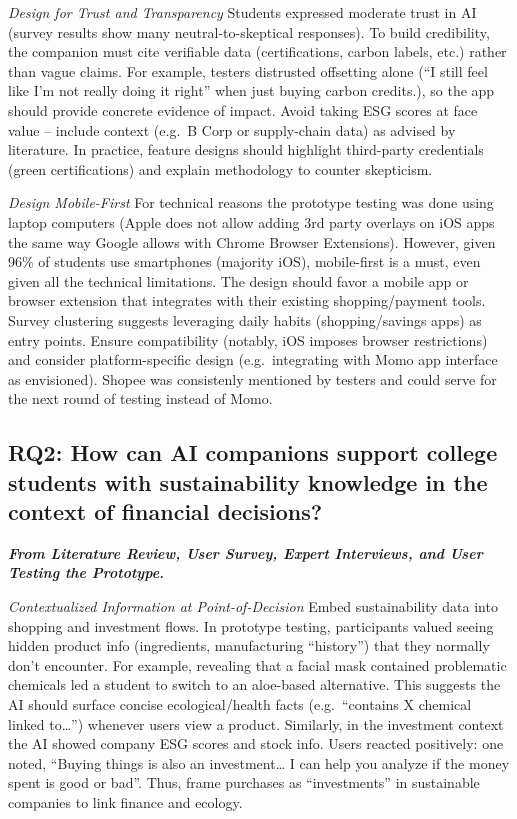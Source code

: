 \documentclass[
  12pt,
  letterpaper,
  DIV=11,
  numbers=noendperiod]{scrartcl}
\begin{document}
\emph{Design for Trust and Transparency} Students expressed moderate
trust in AI (survey results show many neutral-to-skeptical responses).
To build credibility, the companion must cite verifiable data
(certifications, carbon labels, etc.) rather than vague claims. For
example, testers distrusted offsetting alone (``I still feel like I'm
not really doing it right'' when just buying carbon credits.), so the
app should provide concrete evidence of impact. Avoid taking ESG scores
at face value -- include context (e.g.~B Corp or supply-chain data) as
advised by literature. In practice, feature designs should highlight
third-party credentials (green certifications) and explain methodology
to counter skepticism.

\emph{Design Mobile-First} For technical reasons the prototype testing
was done using laptop computers (Apple does not allow adding 3rd party
overlays on iOS apps the same way Google allows with Chrome Browser
Extensions). However, given 96\% of students use smartphones (majority
iOS), mobile-first is a must, even given all the technical limitations.
The design should favor a mobile app or browser extension that
integrates with their existing shopping/payment tools. Survey clustering
suggests leveraging daily habits (shopping/savings apps) as entry
points. Ensure compatibility (notably, iOS imposes browser restrictions)
and consider platform-specific design (e.g.~integrating with Momo app
interface as envisioned). Shopee was consistenly mentioned by testers
and could serve for the next round of testing instead of Momo.

\subsection{RQ2: How can AI companions support college students with
sustainability knowledge in the context of financial
decisions?}\label{rq2-how-can-ai-companions-support-college-students-with-sustainability-knowledge-in-the-context-of-financial-decisions}

\textbf{\emph{From Literature Review, User Survey, Expert Interviews,
and User Testing the Prototype.}}

\emph{Contextualized Information at Point-of-Decision} Embed
sustainability data into shopping and investment flows. In prototype
testing, participants valued seeing hidden product info (ingredients,
manufacturing ``history'') that they normally don't encounter. For
example, revealing that a facial mask contained problematic chemicals
led a student to switch to an aloe-based alternative. This suggests the
AI should surface concise ecological/health facts (e.g.~``contains X
chemical linked to\ldots{}'') whenever users view a product. Similarly,
in the investment context the AI showed company ESG scores and stock
info. Users reacted positively: one noted, ``Buying things is also an
investment\ldots{} I can help you analyze if the money spent is good or
bad''. Thus, frame purchases as ``investments'' in sustainable companies
to link finance and ecology.
\end{document}
